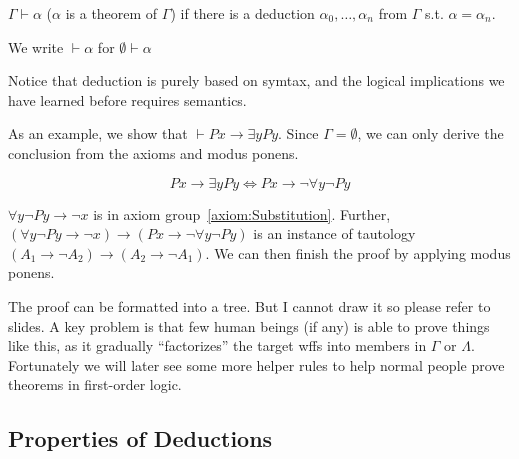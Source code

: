 \begin{definition}
    $\Gamma\vdash\alpha$ ($\alpha$ is a theorem of $\Gamma$) if there is a deduction $\alpha_0,\dots,\alpha_n$ from $\Gamma$ s.t. $\alpha=\alpha_n$.

    We write $\vdash\alpha$ for $\emptyset\vdash\alpha$
\end{definition}

Notice that deduction is purely based on symtax, and the logical implications we have learned before requires semantics.

As an example, we show that $\vdash Px \to \exists yPy$. Since $\Gamma = \emptyset$, we can only derive the conclusion from the axioms and modus ponens.

\[ Px \to \exists yPy \iff Px \to \neg\forall y \neg Py \]

$\forall y \neg Py \to \neg x$ is in axiom group~\ref{axiom:Substitution}. Further, $(\forall y \neg Py \to \neg x) \to (Px \to \neg \forall y \neg Py)$ is an instance of tautology $(A_1 \to \neg A_2) \to (A_2 \to \neg A_1)$. We can then finish the proof by applying modus ponens.

The proof can be formatted into a tree. But I cannot draw it so please refer to slides. A key problem is that few human beings (if any) is able to prove things like this, as it gradually ``factorizes'' the target wffs into members in $\Gamma$ or $\Lambda$. Fortunately we will later see some more helper rules to help normal people prove theorems in first-order logic.

\subsection{Properties of Deductions}

